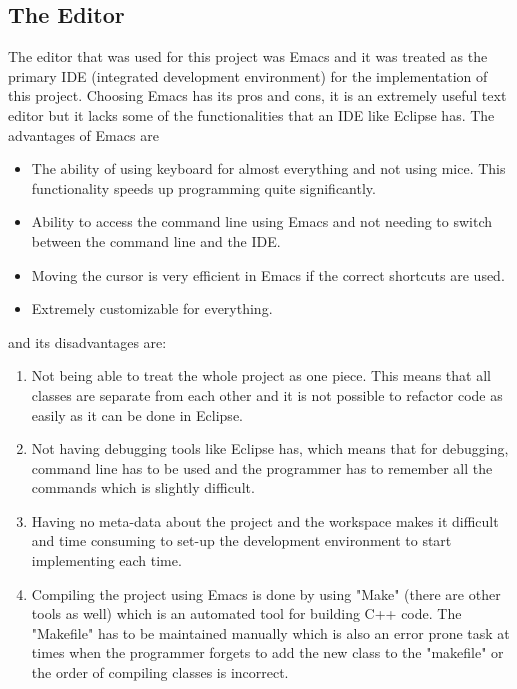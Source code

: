 \documentclass[10pt, a4paper, titlepage]{article}
\begin{document}
\subsection{The Editor}

The editor that was used for this project was Emacs and it was treated as the primary IDE (integrated development environment) for the implementation of this project. Choosing Emacs has its pros and cons, it is an extremely useful text editor but it lacks some of the functionalities that an IDE like Eclipse has. The advantages of Emacs are 

\begin{itemize}
\item The ability of using keyboard for almost everything and not using mice. This functionality speeds up programming quite significantly.
\item Ability to access the command line using Emacs and not needing to switch between the command line and the IDE.
\item Moving the cursor is very efficient in Emacs if the correct shortcuts are used.
\item Extremely customizable for everything. 
\end{itemize}

and its disadvantages are:

\begin{enumerate}
\item Not being able to treat the whole project as one piece. This means that all classes are separate from each other and it is not possible to refactor code as easily as it can be done in Eclipse.
\item Not having debugging tools like Eclipse has, which means that for debugging, command line has to be used and the programmer has to remember all the commands which is slightly difficult.
\item Having no meta-data about the project and the workspace makes it difficult and time consuming to set-up the development environment to start implementing each time.
\item Compiling the project using Emacs is done by using "Make" (there are other tools as well) which is an automated tool for building C++ code. The "Makefile" has to be maintained manually which is also an error prone task at times when the programmer forgets to add the new class to the "makefile" or the order of compiling classes is incorrect.
\end{enumerate}
\end{document}
